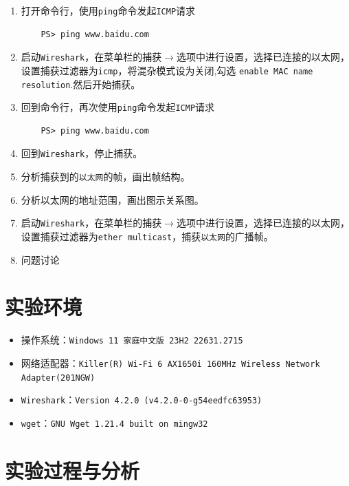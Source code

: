 \documentclass{article}
\begin{document}
\begin{enumerate}[noitemsep, label={{\arabic*})}]
  \item 打开命令行，使用\texttt{ping}命令发起\texttt{ICMP}请求

        \begin{lstlisting}
    PS> ping www.baidu.com
  \end{lstlisting}

  \item 启动\texttt{Wireshark}，在菜单栏的捕获\(\to \)选项中进行设置，选择已连接的以太网，设置捕获过滤器为\texttt{icmp}，将混杂模式设为关闭,勾选
        \texttt{enable MAC name resolution}.然后开始捕获。
  \item 回到命令行，再次使用\texttt{ping}命令发起\texttt{ICMP}请求
        \begin{lstlisting}
    PS> ping www.baidu.com
  \end{lstlisting}
  \item 回到\texttt{Wireshark}，停止捕获。
  \item 分析捕获到的\texttt{以太网}的帧，画出帧结构。
  \item 分析以太网的地址范围，画出图示关系图。
  \item 启动\texttt{Wireshark}，在菜单栏的捕获\(\to \)选项中进行设置，选择已连接的以太网，设置捕获过滤器为\texttt{ether multicast}，捕获\texttt{以太网}的广播帧。
  \item 问题讨论
\end{enumerate}

\section{实验环境}


\begin{itemize}[noitemsep]
  \item 操作系统：\texttt{Windows 11 家庭中文版 23H2 22631.2715}
  \item 网络适配器：\texttt{Killer(R) Wi-Fi 6 AX1650i 160MHz Wireless Network \\ Adapter(201NGW)}
  \item \texttt{Wireshark}：\texttt{Version 4.2.0 (v4.2.0-0-g54eedfc63953)}
  \item \texttt{wget}：\texttt{GNU Wget 1.21.4 built on mingw32}
\end{itemize}


\section{实验过程与分析}
\end{document}
